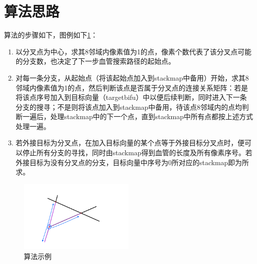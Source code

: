 \documentclass[12pt]{article}
\begin{document}
\section{算法思路}
算法的步骤如下，图例如下\ref{fig:例子}：
\begin{enumerate}
\item 以分叉点为中心，求其8邻域内像素值为1的点，像素个数代表了该分叉点可能的分支数，也决定了下一步血管搜索路径的起始点。
\item 对每一条分支，从起始点（将该起始点加入到stackmap中备用）开始，求其8邻域内像素值为1的点，然后判断该点是否属于分叉点的连接关系矩阵：若是将该点序号加入到目标向量（targetbifu）中以便后续判断，同时进入下一条分支的搜寻；不是则将该点加入到stackmap中备用，待该点8邻域内的点均判断一遍后，处理stackmap中的下一个点，直到stackmap中所有点都按上述方式处理一遍。
\item 若外接目标为分叉点，在加入目标向量的某个点等于外接目标分叉点时，便可以停止所有分支的寻找，同时由stackmap得到血管的长度及所有像素序号。若外接目标为没有分叉点的分支，目标向量中序号为0所对应的stackmap即为所求。
\end{enumerate}
\begin{figure}[ht]
\centering
\includegraphics[width=0.5\textwidth]{images/例子}
\caption{算法示例}
\label{fig:例子}
\end{figure}
\end{document}
